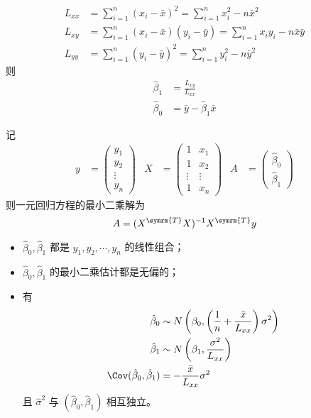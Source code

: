  \begin{align}
    L_{xx} &= \sum_{i=1}^{n} (x_i - \bar{x})^2 = \sum_{i=1}^{n}x_i^2 - n \bar{x}^2 \\
    L_{xy} &= \sum_{i=1}^{n} (x_i - \bar{x})(y_i - \bar{y}) = \sum_{i=1}^{n}x_iy_i - n\bar{x}\bar{y} \\
    L_{yy} &= \sum_{i=1}^{n} (y_i - \bar{y})^2 = \sum_{i=1}^{n}y_i^2 - n \bar{y}^2
\end{align}
则 \begin{align}
    \hat{\beta}_1 &= \frac{L_{xy}}{L_{xx}} \\
    \hat{\beta}_0 &= \bar{y} - \hat{\beta}_1 \bar{x}
\end{align}

 记 \begin{align}
    y & = \begin{pmatrix}
        y_1 \\ y_2 \\ \vdots \\ y_n
    \end{pmatrix} &
    X & = \begin{pmatrix}
        1 & x_1 \\ 1 & x_2 \\ \vdots & \vdots \\ 1 & x_n
    \end{pmatrix} &
    A & = \begin{pmatrix}
        \hat{\beta}_0 \\ \hat{\beta}_1
    \end{pmatrix}
\end{align}
则一元回归方程的最小二乘解为
\begin{equation}
    A = (X^{\symrm{T}}X)^{-1} X^{\symrm{T}}y
\end{equation}

\begin{itemize}[leftmargin=\subparitemindent]
    \item $ \hat{\beta}_0, \hat{\beta}_1 $ 都是 $ y_1, y_2, \cdots, y_n $ 的线性组合；
    \item $ \hat{\beta}_0, \hat{\beta}_1 $ 的最小二乘估计都是无偏的；
    \item 有 \begin{align}
        \hat{\beta}_0 & \sim N \left( \beta_0 , \left(\frac{1}{n} + \frac{\bar{x}}{L_{xx}}\right)\sigma^2 \right) \\
        \hat{\beta}_1 & \sim N \left( \beta_1 , \frac{\sigma^2}{L_{xx}} \right) \\
        \Cov(\hat{\beta}_0, \hat{\beta}_1) &= - \frac{\bar{x}}{L_{xx}} \sigma^2
    \end{align}
    且 $ \hat{\sigma}^2 $ 与 $ \left( \hat{\beta}_0, \hat{\beta}_1 \right) $ 相互独立。
\end{itemize}



